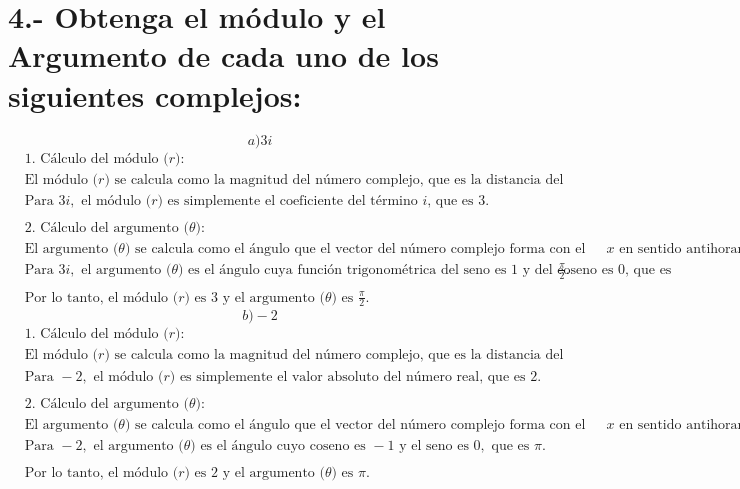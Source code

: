 \documentclass{article}
\begin{document}
\section*{4.- Obtenga el módulo y el Argumento de cada uno de los siguientes complejos: }
\[
a) 3i
\]
\begin{align*}
&\text{1. Cálculo del módulo (\(r\)):} \\
&\text{El módulo (\(r\)) se calcula como la magnitud del número complejo, que es la distancia del origen al punto que representa el número en el plano complejo.} \\
&\text{Para } 3i, \text{ el módulo (\(r\)) es simplemente el coeficiente del término \(i\), que es } 3. \\
& \\
&\text{2. Cálculo del argumento (\(\theta\)):} \\
&\text{El argumento (\(\theta\)) se calcula como el ángulo que el vector del número complejo forma con el eje positivo de las \(x\) en sentido antihorario.} \\
&\text{Para } 3i, \text{ el argumento (\(\theta\)) es el ángulo cuya función trigonométrica del seno es \(1\) y del coseno es \(0\), que es } \frac{\pi}{2}. \\
& \\
&\text{Por lo tanto, el módulo (\(r\)) es } 3 \text{ y el argumento (\(\theta\)) es } \frac{\pi}{2}.
\end{align*}
\[
b) -2
\]
\begin{align*}
&\text{1. Cálculo del módulo (\(r\)):} \\
&\text{El módulo (\(r\)) se calcula como la magnitud del número complejo, que es la distancia del origen al punto que representa el número en el plano complejo.} \\
&\text{Para } -2, \text{ el módulo (\(r\)) es simplemente el valor absoluto del número real, que es } 2. \\
& \\
&\text{2. Cálculo del argumento (\(\theta\)):} \\
&\text{El argumento (\(\theta\)) se calcula como el ángulo que el vector del número complejo forma con el eje positivo de las \(x\) en sentido antihorario.} \\
&\text{Para } -2, \text{ el argumento (\(\theta\)) es el ángulo cuyo coseno es } -1 \text{ y el seno es } 0, \text{ que es } \pi. \\
& \\
&\text{Por lo tanto, el módulo (\(r\)) es } 2 \text{ y el argumento (\(\theta\)) es } \pi.
\end{align*}
\end{document}
